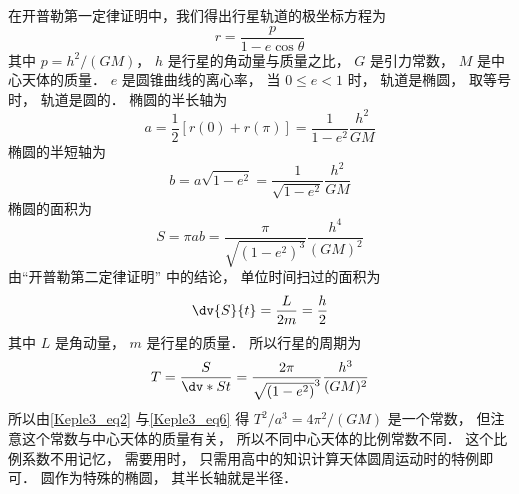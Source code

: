 

在开普勒第一定律证明中，我们得出行星轨道的极坐标方程为
\begin{equation}\label{Keple3_eq1}
  r = \frac{p}{1 - e \cos \theta }
\end{equation}
其中 $p = h^2/(GM)$，  $h$ 是行星的角动量与质量之比， $G$ 是引力常数， $M$ 是中心天体的质量． $e$ 是圆锥曲线的离心率， 当 $0 \le e < 1$ 时， 轨道是椭圆， 取等号时， 轨道是圆的． 椭圆的半长轴为
\begin{equation}\label{Keple3_eq2}
a = \frac{1}{2}[r(0) + r(\pi)] = \frac{1}{1 - e^2}\frac{h^2}{GM}
\end{equation}
椭圆的半短轴为
\begin{equation}\label{Keple3_eq3}
b = a\sqrt {1 - e^2}  = \frac{1}{\sqrt {1 - e^2}}\frac{h^2}{GM}
\end{equation}
椭圆的面积为
\begin{equation}\label{Keple3_eq4}
S = \pi ab = \frac{\pi }{\sqrt{(1 - e^2)^3} }\frac{h^4}{(GM)^2}
\end{equation}
由“开普勒第二定律证明” 中的结论， 单位时间扫过的面积为
\begin{equation}\label{Keple3_eq5}
\dv{S}{t} = \frac{L}{2m} = \frac{h}{2}
\end{equation}
其中 $L$ 是角动量， $m$ 是行星的质量． 所以行星的周期为
\begin{equation}\label{Keple3_eq6}
  T = \frac{S}{\dv*{S}{t}} = \frac{2\pi}{\sqrt{(1 - e^2)}^3}\frac{h^3}{(GM)^2}
\end{equation}
所以由\autoref{Keple3_eq2} 与\autoref{Keple3_eq6} 得 $T^2/a^3 = 4\pi ^2/(GM)$ 是一个常数， 但注意这个常数与中心天体的质量有关， 所以不同中心天体的比例常数不同． 这个比例系数不用记忆， 需要用时， 只需用高中的知识计算天体圆周运动时的特例即可． 圆作为特殊的椭圆， 其半长轴就是半径．
